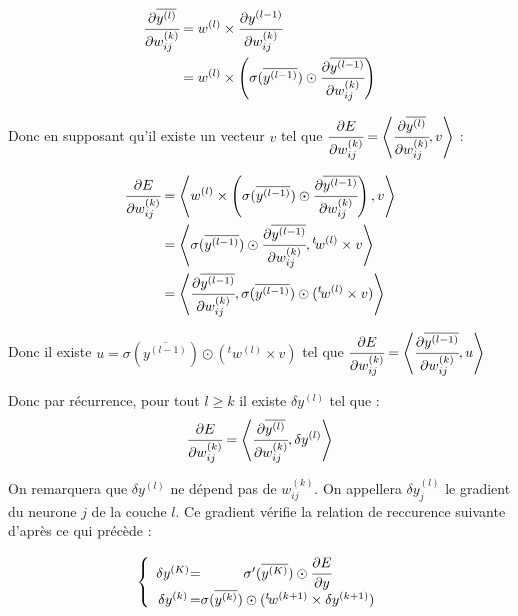\begin{align*}
\cfrac{\partial \overline{y^{(l)}}}{\partial w_{ij}^{(k)}} &= w^{(l)} \times \cfrac{\partial y^{(l-1)}}{\partial w_{ij}^{(k)}}\\
&= w^{(l)} \times \left(\sigma(\overline{y^{(l-1)}}) \odot \cfrac{\partial \overline{y^{(l-1)}}}{\partial w_{ij}^{(k)}}\right)
\end{align*}

Donc en supposant qu'il existe un vecteur $v$ tel que $\cfrac{\partial E}{\partial w_{ij}^{(k)}} = \left\langle\cfrac{\partial \overline{y^{(l)}}}{\partial w_{ij}^{(k)}} ,v\right\rangle$ :

\begin{align*}
\cfrac{\partial E}{\partial w_{ij}^{(k)}} &= \left\langle w^{(l)} \times \left(\sigma(\overline{y^{(l-1)}}) \odot \cfrac{\partial \overline{y^{(l-1)}}}{\partial w_{ij}^{(k)}}\right) ,v\right\rangle\\
&= \left\langle\sigma(\overline{y^{(l-1)}}) \odot \cfrac{\partial \overline{y^{(l-1)}}}{\partial w_{ij}^{(k)}},{}^t \! w^{(l)} \times v\right\rangle\\
&= \left\langle\cfrac{\partial \overline{y^{(l-1)}}}{\partial w_{ij}^{(k)}},\sigma(\overline{y^{(l-1)}}) \odot ({}^t \! w^{(l)} \times v)\right\rangle\\
\end{align*}

Donc il existe $u = \sigma(\overline{y^{(l-1)}}) \odot ({}^t \! w^{(l)} \times v)$ tel que $\cfrac{\partial E}{\partial w_{ij}^{(k)}} = \left\langle\cfrac{\partial \overline{y^{(l-1)}}}{\partial w_{ij}^{(k)}} ,u\right\rangle$

Donc par récurrence, pour tout $l \geq k$ il existe $\delta y^{(l)}$ tel que :
\[\cfrac{\partial E}{\partial w_{ij}^{(k)}} = \left\langle\cfrac{\partial \overline{y^{(l)}}}{\partial w_{ij}^{(k)}} ,\delta y^{(l)}\right\rangle\]

On remarquera que $\delta y^{(l)}$ ne dépend pas de $w_{ij}^{(k)}$. On appellera $\delta y^{(l)}_j$ le gradient du neurone $j$ de la couche $l$. Ce gradient vérifie la relation de reccurence suivante d'après ce qui précède :

\[
\left \{
\begin{array}{c @{=} c}
    \delta y^{(K)} & \sigma'(\overline{y^{(K)}}) \odot \cfrac{\partial E}{\partial y}\\
    \delta y^{(k)} & \sigma(\overline{y^{(k)}}) \odot ({}^t \! w^{(k+1)} \times \delta y^{(k+1)})\\
\end{array}
\right.
\]


